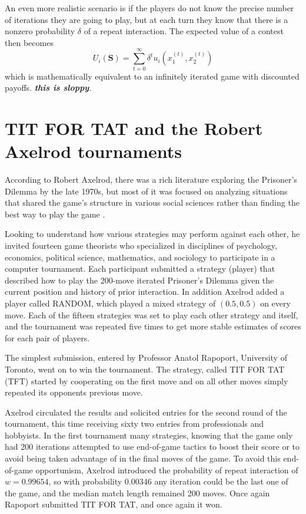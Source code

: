An even more realistic scenario is if the players do not know the precise number of iterations they are going to play, but at each turn they know that there is a nonzero probability $\delta$ of a repeat interaction. The expected value of a contest then becomes
\[
U_i(\mathbf{S}) = \sum_{t=0}^\infty \delta^t u_i\left(x^{(t)}_1, x^{(t)}_2\right)
\]
which is mathematically equivalent to an infinitely iterated game with discounted payoffs. \textit{\textbf{this is sloppy}}.

\chapter{TIT FOR TAT and the Robert Axelrod tournaments}

According to Robert Axelrod, there was a rich literature exploring the Prisoner's Dilemma by the late 1970s, but most of it was focused on analyzing situations that shared the game's structure in various social sciences rather than finding the best way to play the game \cite[p.28]{axelrod1984evolution}. 

Looking to understand how various strategies may perform against each other, he invited fourteen game theorists who specialized in disciplines of psychology, economics, political science, mathematics, and sociology to participate in a computer tournament. Each participant submitted a strategy (player) that described how to play the 200-move iterated Prisoner's Dilemma given the current position and history of prior interaction. In addition Axelrod added a player called RANDOM, which played a mixed strategy of $(0.5, 0.5)$  on every move. Each of the fifteen strategies was set to play each other strategy and itself, and the tournament was repeated five times to get more stable estimates of scores for each pair of players.

The simplest submission, entered by Professor Anatol Rapoport, University of Toronto, went on to win the tournament. The strategy, called TIT FOR TAT (TFT) started by cooperating on the first move and on all other moves simply repeated its opponents previous move.

Axelrod circulated the results and solicited entries for the second round of the tournament, this time receiving sixty two entries from professionals and hobbyists. In the first tournament many strategies, knowing that the game only had 200 iterations attempted to use end-of-game tactics to boost their score or to avoid being taken advantage of in the final moves of the game. To avoid this end-of-game opportunism, Axelrod introduced the probability of repeat interaction of $w = 0.99654$, so with probability $0.00346$ any iteration could be the last one of the game, and the median match length remained 200 moves. Once again Rapoport submitted TIT FOR TAT, and once again it won.

